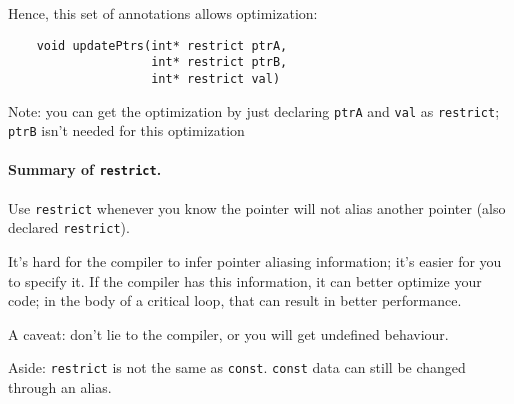 Hence, this set of annotations allows optimization:
\begin{verbatim}
    void updatePtrs(int* restrict ptrA, 
                    int* restrict ptrB,
                    int* restrict val)
\end{verbatim}
Note: you can get the optimization by just declaring {\tt ptrA} and
      {\tt val} as {\tt restrict}; {\tt ptrB} isn't needed for this optimization

\paragraph{Summary of {\tt restrict}.}
Use {\tt restrict} whenever you know the pointer will not alias
another pointer (also declared {\tt restrict}).

It's hard for the compiler to infer pointer aliasing information;
it's easier for you to specify it. If the compiler has this information,
it can better optimize your code; in the body of a critical loop, that
can result in better performance.

A caveat: don't lie to the compiler, or you will get undefined behaviour.

Aside: {\tt restrict} is not the same as {\tt const}. {\tt const} data can still be
changed through an alias.






